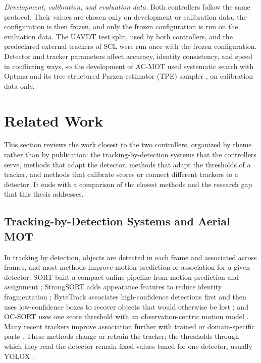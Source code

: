\emph{Development, calibration, and evaluation data.} Both controllers follow the same protocol. Their values are chosen only on development or calibration data, the configuration is then frozen, and only the frozen configuration is run on the evaluation data. The UAVDT test split, used by both controllers, and the predeclared external trackers of SCL were run once with the frozen configuration. Detector and tracker parameters affect accuracy, identity consistency, and speed in conflicting ways, so the development of AC-MOT used systematic search with Optuna and its tree-structured Parzen estimator (TPE) sampler \cite{akiba2019optuna}, on calibration data only.

\section{Related Work}\label{sec:rw}
This section reviews the work closest to the two controllers, organized by theme rather than by publication: the tracking-by-detection systems that the controllers serve, methods that adapt the detector, methods that adapt the thresholds of a tracker, and methods that calibrate scores or connect different trackers to a detector. It ends with a comparison of the closest methods and the research gap that this thesis addresses.

\subsection{Tracking-by-Detection Systems and Aerial MOT}\label{sec:rw-tbd}
In tracking by detection, objects are detected in each frame and associated across frames, and most methods improve motion prediction or association for a given detector. SORT built a compact online pipeline from motion prediction and assignment \cite{bewley2016sort}; StrongSORT adds appearance features to reduce identity fragmentation \cite{du2023strongsort}; ByteTrack associates high-confidence detections first and then uses low-confidence boxes to recover objects that would otherwise be lost \cite{zhang2022bytetrack}; and OC-SORT uses one score threshold with an observation-centric motion model \cite{cao2023ocsort}. Many recent trackers improve association further with trained or domain-specific parts \cite{li2024fdbtrack,bao2024graphmatching,zhang2025sinkhorn,ding2025remot,liang2024motiontrack,sun2026bsr}. These methods change or retrain the tracker; the thresholds through which they read the detector remain fixed values tuned for one detector, usually YOLOX \cite{ge2021yolox}.

